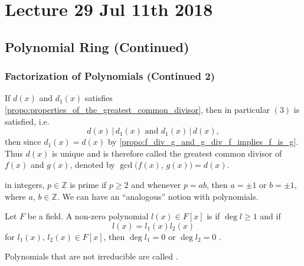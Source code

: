\chapter{Lecture 29 Jul 11th 2018}%
\label{chp:lecture_29_jul_11th_2018}

\section{Polynomial Ring (Continued)}%
\label{sec:polynomial_ring_continued}

\subsection{Factorization of Polynomials (Continued 2)}%
\label{sub:factorization_of_polynomials_continued_2}

\begin{note}
  If $d(x)$ and $d_1(x)$ satisfies \cref{propo:properties_of_the_greatest_common_divisor}, then in particular $(3)$ is satisfied, i.e.
  \begin{equation*}
    d(x) \, | \, d_1(x) \text{ and } d_1(x) \, | \, d(x),
  \end{equation*}
  then since $d_1(x) = d(x)$ by \cref{propo:f_div_g_and_g_div_f_implies_f_is_g}. Thus $d(x)$ is unique and is therefore called the greatest common divisor of $f(x)$ and $g(x)$, denoted by $\gcd\Big( f(x), \, g(x) \Big) = d(x)$.
\end{note}

 in integers, $p \in \mathbb{Z}$ is prime if $p \geq 2$ and whenever $p = ab$, then $a = \pm 1$ or $b = \pm 1$, where $a, \, b \in \mathbb{Z}$. We can have an ``analogous'' notion with polynomials.

\begin{defn}
\label{defn:irreducible_polynomials}
  Let $F$ be a field. A non-zero polynomial $l(x) \in F[x]$ is  if $\deg l \geq 1$ and if
  \begin{equation*}
    l(x) = l_1 (x) l_2 (x)
  \end{equation*}
  for $l_1(x), \, l_2 (x) \in F[x]$, then $\deg l_1 = 0$ or $\deg l_2 = 0$ .

  Polynomials that are not irreducible are called .
\end{defn}


